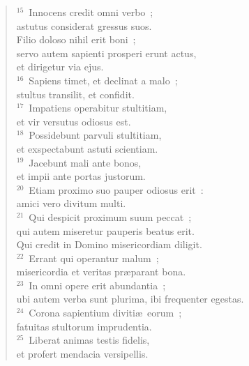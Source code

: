 \begin{flushleft}\begin{verse}${}^{15}$~Innocens credit omni verbo~;\\ astutus considerat gressus suos.\\ Filio doloso nihil erit boni~;\\ servo autem sapienti prosperi erunt actus,\\ et dirigetur via ejus.\\
${}^{16}$~Sapiens timet, et declinat a malo~;\\ stultus transilit, et confidit.\\
${}^{17}$~Impatiens operabitur stultitiam,\\ et vir versutus odiosus est.\\
${}^{18}$~Possidebunt parvuli stultitiam,\\ et exspectabunt astuti scientiam.\\
${}^{19}$~Jacebunt mali ante bonos,\\ et impii ante portas justorum.\\
${}^{20}$~Etiam proximo suo pauper odiosus erit~:\\ amici vero divitum multi.\\
${}^{21}$~Qui despicit proximum suum peccat~;\\ qui autem miseretur pauperis beatus erit.\\ Qui credit in Domino misericordiam diligit.\\
${}^{22}$~Errant qui operantur malum~;\\ misericordia et veritas pr\ae parant bona.\\
${}^{23}$~In omni opere erit abundantia~;\\ ubi autem verba sunt plurima, ibi frequenter egestas.\\
${}^{24}$~Corona sapientium diviti\ae\ eorum~;\\ fatuitas stultorum imprudentia.\\
${}^{25}$~Liberat animas testis fidelis,\\ et profert mendacia versipellis.\end{verse}\end{flushleft}


